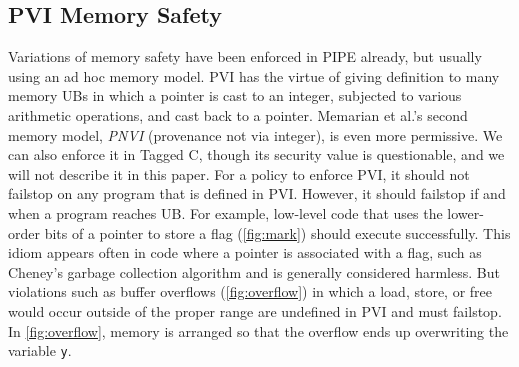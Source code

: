 \documentclass{llncs}
\begin{document}
\begin{table}[t]
\subsection{PVI Memory Safety}
\label{sec:PVI}


Variations of memory safety have been enforced in PIPE already, but usually using
an ad hoc memory model. PVI has the virtue of giving definition to many memory UBs in which a pointer is
cast to an integer, subjected to various arithmetic operations, and cast back to a pointer.
Memarian et al.'s second memory model, {\it PNVI} (provenance not via integer), is even more permissive.
We can also enforce it in Tagged C, though its security value is questionable, and we will
not describe it in this paper.
For a policy to enforce PVI, it should not failstop on any program that is defined in PVI.
However, it should failstop if and when a program reaches UB. For example, low-level code
that uses the lower-order bits of a pointer to store a flag (\cref{fig:mark}) should
execute successfully. This idiom appears often in code where a pointer is associated with a flag,
such as Cheney's garbage collection algorithm \cite{} and is generally considered harmless.
But violations such as buffer overflows (\cref{fig:overflow}) in which a load, store, or free would
occur outside of the proper range are undefined in PVI and must failstop. In \cref{fig:overflow},
memory is arranged so that the overflow ends up overwriting the variable {\tt y}.

\end{table}
\end{document}
